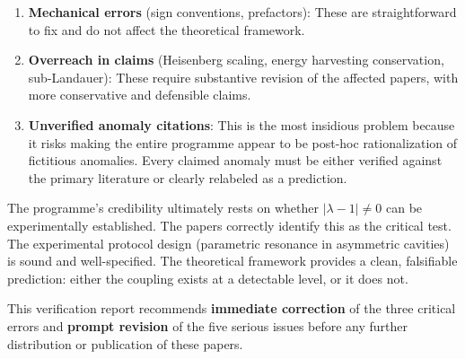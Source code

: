 \documentclass[12pt,a4paper]{article}
\begin{document}
\begin{enumerate}
\item \textbf{Mechanical errors} (sign conventions, prefactors): These are
straightforward to fix and do not affect the theoretical framework.

\item \textbf{Overreach in claims} (Heisenberg scaling, energy harvesting
conservation, sub-Landauer): These require substantive revision of the
affected papers, with more conservative and defensible claims.

\item \textbf{Unverified anomaly citations}: This is the most insidious
problem because it risks making the entire programme appear to be
post-hoc rationalization of fictitious anomalies. Every claimed anomaly
must be either verified against the primary literature or clearly
relabeled as a prediction.
\end{enumerate}

The programme's credibility ultimately rests on whether $|\lambda - 1| \neq 0$
can be experimentally established. The papers correctly identify this as the
critical test. The experimental protocol design (parametric resonance in
asymmetric cavities) is sound and well-specified. The theoretical framework
provides a clean, falsifiable prediction: either the coupling exists at a
detectable level, or it does not.

This verification report recommends \textbf{immediate correction} of the
three critical errors and \textbf{prompt revision} of the five serious
issues before any further distribution or publication of these papers.
\end{document}
